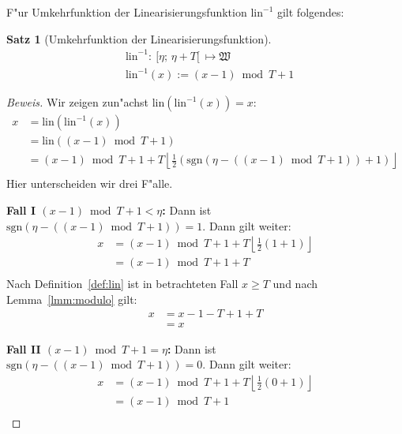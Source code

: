 \documentclass[a4paper]{article}
\newcommand*{\linf}{\mathrm{lin}}
\newcommand*{\sgn}{\mathrm{sgn}}
\newcommand*{\wkdays}{\mathfrak{W}}
\numberwithin{equation}{section}
\newtheorem{thm}{Satz}
\begin{document}
\noindent F"ur Umkehrfunktion der Linearisierungsfunktion $\linf^{-1}$ gilt
folgendes:
\begin{thm}[Umkehrfunktion der Linearisierungsfunktion]
  \begin{equation}
  \begin{split}
    & \linf^{-1} :\ [\eta;\,\eta + T[\ \mapsto \wkdays \\
    & \linf^{-1}(x) := (x - 1) \bmod T + 1
  \end{split}
  \end{equation}
\end{thm}
\begin{proof}[Beweis]
  Wir zeigen zun"achst $\linf(\linf^{-1}(x)) = x$:
  \begin{equation}
  \begin{split}
    x & = \linf(\linf^{-1}(x)) \\
    & = \linf((x - 1) \bmod T + 1) \\
    & = (x - 1) \bmod T + 1 + T\left\lfloor\frac{1}{2}
      (\sgn(\eta - ((x - 1) \bmod T + 1)) + 1)\right\rfloor \\
  \end{split}
  \end{equation}
  Hier unterscheiden wir drei F"alle.

  \noindent\textbf{Fall I $(x - 1) \bmod T + 1 < \eta$:} Dann ist
  $\sgn(\eta - ((x - 1) \bmod T + 1)) = 1$. Dann gilt weiter:
  \begin{equation}
  \begin{split}
    x & = (x - 1) \bmod T + 1 + T\left\lfloor\frac{1}{2} (1 + 1)\right\rfloor \\
    & = (x - 1) \bmod T + 1 + T \\
  \end{split}
  \end{equation}
  Nach Definition~\ref{def:lin} ist in betrachteten Fall $x \ge T$ und nach
  Lemma~\ref{lmm:modulo} gilt:
  \begin{equation}
  \begin{split}
    x & = x - 1 - T + 1 + T \\
    & = x
  \end{split}
  \end{equation}

  \noindent\textbf{Fall II $(x - 1) \bmod T + 1 = \eta$:} Dann ist
  $\sgn(\eta - ((x - 1) \bmod T + 1)) = 0$. Dann gilt weiter:
  \begin{equation}
  \begin{split}
    x & = (x - 1) \bmod T + 1 + T\left\lfloor\frac{1}{2} (0 + 1)\right\rfloor \\
    & = (x - 1) \bmod T + 1 \\
  \end{split}
  \end{equation}


\end{proof}
\end{document}
